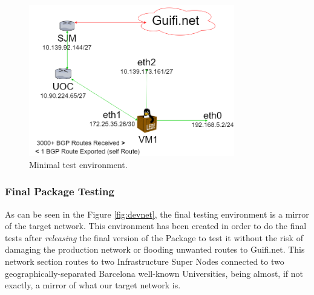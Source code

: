 \begin{figure}[H]
        \centering
        \includegraphics[width=0.8\textwidth]{images/devmin}
        \caption{Minimal test environment.}
        \label{fig:mindev}
	\end{figure}

\subsubsection{Final Package Testing}
As can be seen in the Figure \ref{fig:devnet}, the final testing environment is a mirror of the target network. This environment has been created in order to do the final tests after \textit{releasing} the final version of the Package to test it without the risk of damaging the production network or flooding unwanted routes to Guifi.net. This network section routes to two Infrastructure Super Nodes connected to two geographically-separated Barcelona well-known Universities, being almost, if not exactly, a mirror of what our target network is.

